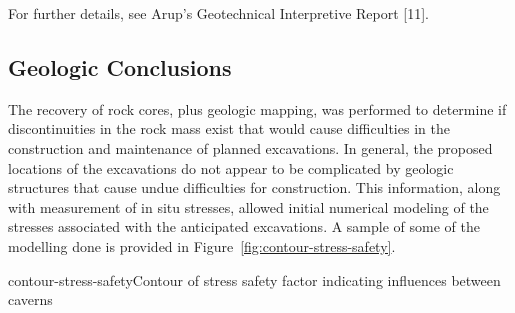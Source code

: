 For further details, see Arup's Geotechnical Interpretive Report [11]. 

\subsection{Geologic Conclusions}
\label{sec:fscf-site-cond-geo-concl}

The recovery of rock cores, plus geologic mapping, was performed to determine if discontinuities in the rock mass exist that would cause difficulties in the construction and maintenance of planned excavations. In general, the proposed locations of the excavations do not appear to be complicated by geologic structures that cause undue difficulties for construction. This information, along with measurement of in situ stresses, allowed initial numerical modeling of the stresses associated with the anticipated excavations. A sample of some of the modelling done is provided in Figure~\ref{fig:contour-stress-safety}.

\begin{cdrfigure}{contour-stress-safety}{Contour of stress safety factor indicating influences between caverns}
\end{cdrfigure}

